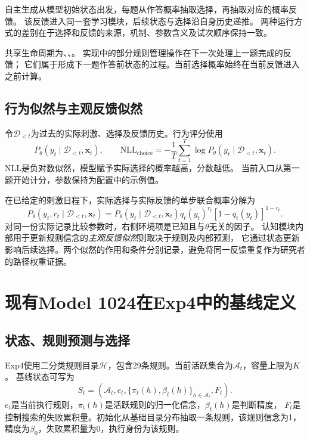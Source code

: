 \documentclass[11pt,a4paper]{article}
\numberwithin{equation}{section}
\newcommand{\A}{\mathcal A}
\newcommand{\Hh}{\mathcal H}
\begin{document}
自主生成从模型初始状态出发，每题从作答概率抽取选择，再抽取对应的概率反馈。
该反馈进入同一套学习模块，后续状态与选择沿自身历史递推。
两种运行方式的差别在于选择和反馈的来源，机制、参数含义及试次顺序保持一致。

共享生命周期为、、。
实现中的部分规则管理操作在下一次处理上一题完成的反馈；
它们属于形成下一题作答前状态的过程。当前选择概率始终在当前反馈进入之前计算。

\subsection{行为似然与主观反馈似然}
令$\mathcal D_{<t}$为过去的实际刺激、选择及反馈历史。行为评分使用
\begin{equation}
P_\theta(y_t\mid\mathcal D_{<t},\bm x_t),\qquad
\mathrm{NLL}_{\mathrm{choice}}=-\frac1T\sum_{t=1}^T
\log P_\theta(y_t\mid\mathcal D_{<t},\bm x_t).
\label{eq:nll}
\end{equation}
NLL是负对数似然，模型赋予实际选择的概率越高，分数越低。
当前入口从第一题开始计分，参数保持为配置中的示例值。

在已给定的刺激日程下，实际选择与实际反馈的单步联合概率分解为
\begin{equation}
P_\theta(y_t,r_t\mid\mathcal D_{<t},\bm x_t)
=P_\theta(y_t\mid\mathcal D_{<t},\bm x_t)
q_t(y_t)^{r_t}[1-q_t(y_t)]^{1-r_t}.
\end{equation}
对同一份实际记录比较参数时，右侧环境项是已知且与$\theta$无关的因子。
认知模块内部用于更新规则信念的\emph{主观反馈似然}则取决于规则及内部预测，
它通过状态更新影响后续选择。两个似然的作用和条件分别记录，避免将同一反馈重复作为研究者的路径权重证据。

\section{现有Model 1024在Exp4中的基线定义}
\label{sec:baseline}

\subsection{状态、规则预测与选择}
Exp4使用二分类规则目录$\Hh$，包含29条规则。当前活跃集合为$\A_t$，容量上限为$K$。
基线状态可写为
\begin{equation}
S_t=\left(\A_t,e_t,\{\pi_t(h),\beta_t(h)\}_{h\in\A_t},F_t\right).
\end{equation}
$e_t$是当前执行规则，$\pi_t(h)$是活跃规则的归一化信念，$\beta_t(h)$是判断精度，
$F_t$是控制搜索的失败累积量。初始化从基础目录分布抽取一条规则，该规则信念为1，
精度为$\beta_0$，失败累积量为0，执行身份为该规则。
\end{document}
